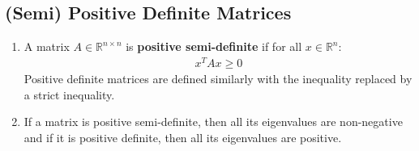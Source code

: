 \documentclass[letterpaper, 11pt]{article}
\newcommand{\R}{\mathbb{R}}	%
\newcommand{\1}{\mathds{1}}	%
\theoremstyle{definition}
\begin{document}
\subsection{(Semi) Positive Definite Matrices}
\begin{enumerate}
    \item A matrix $A \in \R^{n \times n}$ is \textbf{positive semi-definite} if for all $x \in \R^n$:
    \begin{align}
        x^T A x \geq 0 
    \end{align}
    Positive definite matrices are defined similarly with the inequality replaced by a strict inequality.
    \item If a matrix is positive semi-definite, then all its eigenvalues are non-negative and if it is positive definite, then all its eigenvalues are positive.

\end{enumerate}
\end{document}
